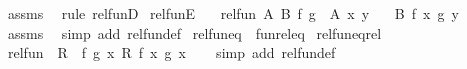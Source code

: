 \begin{isabellebody}
\ assms\ \isamarkupfalse%
\ {\isacharparenleft}{\kern0pt}rule\ rel{\isacharunderscore}{\kern0pt}funD{\isacharparenright}{\kern0pt}%
\endisatagproof
{\isafoldproof}%
%
\isadelimproof
\isanewline
%
\endisadelimproof
\isanewline
{}\isamarkupfalse%
\ rel{\isacharunderscore}{\kern0pt}funE{\isacharcolon}{\kern0pt}\isanewline
\ \ \ {\isachardoublequoteopen}rel{\isacharunderscore}{\kern0pt}fun\ A\ B\ f\ g{\isachardoublequoteclose}\ \ {\isachardoublequoteopen}A\ x\ y{\isachardoublequoteclose}\isanewline
\ \ \ {\isachardoublequoteopen}B\ {\isacharparenleft}{\kern0pt}f\ x{\isacharparenright}{\kern0pt}\ {\isacharparenleft}{\kern0pt}g\ y{\isacharparenright}{\kern0pt}{\isachardoublequoteclose}\isanewline
%
\isadelimproof
\ \ %
\endisadelimproof
%
\isatagproof
{}\isamarkupfalse%
\ assms\ \isamarkupfalse%
\ {\isacharparenleft}{\kern0pt}simp\ add{\isacharcolon}{\kern0pt}\ rel{\isacharunderscore}{\kern0pt}fun{\isacharunderscore}{\kern0pt}def{\isacharparenright}{\kern0pt}%
\endisatagproof
{\isafoldproof}%
%
\isadelimproof
\isanewline
%
\endisadelimproof
\isanewline
{}\isamarkupfalse%
\ rel{\isacharunderscore}{\kern0pt}fun{\isacharunderscore}{\kern0pt}eq\ {\isacharequal}{\kern0pt}\ fun{\isachardot}{\kern0pt}rel{\isacharunderscore}{\kern0pt}eq\isanewline
\isanewline
{}\isamarkupfalse%
\ rel{\isacharunderscore}{\kern0pt}fun{\isacharunderscore}{\kern0pt}eq{\isacharunderscore}{\kern0pt}rel{\isacharcolon}{\kern0pt}\isanewline
{}\ {\isachardoublequoteopen}rel{\isacharunderscore}{\kern0pt}fun\ {\isacharparenleft}{\kern0pt}{\isacharequal}{\kern0pt}{\isacharparenright}{\kern0pt}\ R\ {\isacharequal}{\kern0pt}\ {\isacharparenleft}{\kern0pt}{\isasymlambda}f\ g{\isachardot}{\kern0pt}\ {\isasymforall}x{\isachardot}{\kern0pt}\ R\ {\isacharparenleft}{\kern0pt}f\ x{\isacharparenright}{\kern0pt}\ {\isacharparenleft}{\kern0pt}g\ x{\isacharparenright}{\kern0pt}{\isacharparenright}{\kern0pt}{\isachardoublequoteclose}\isanewline
%
\isadelimproof
\ \ %
\endisadelimproof
%
\isatagproof
{}\isamarkupfalse%
\ {\isacharparenleft}{\kern0pt}simp\ add{\isacharcolon}{\kern0pt}\ rel{\isacharunderscore}{\kern0pt}fun{\isacharunderscore}{\kern0pt}def{\isacharparenright}{\kern0pt}%
\endisatagproof
{\isafoldproof}%
%
\isadelimproof
%
\endisadelimproof
%
\isadelimdocument
%
\endisadelimdocument
%
\isatagdocument
%
\isamarkuptrue%
%
\endisatagdocument
{\isafolddocument}%
%
\isadelimdocument
%
\endisadelimdocument

\end{isabellebody}
